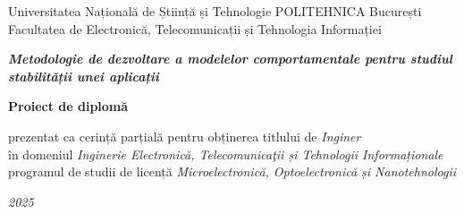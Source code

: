 \documentclass[12pt, a4paper, oneside, romanian]{teza-upb}
\begin{document}
\begin{titlepage}
\begin{center}
    \large Universitatea Națională de Știință și Tehnologie POLITEHNICA București\\
    \large Facultatea de Electronică, Telecomunicații și Tehnologia Informației\\
    
    \vspace*{7\baselineskip}
    
    \Large \textbf{\textit{Metodologie de dezvoltare a modelelor comportamentale pentru studiul stabilității unei aplicații}}\\
    
    \vspace*{2\baselineskip}

    \Huge \textbf{Proiect de diplomă}\\
    
    \vspace*{0.25\baselineskip}
    
    \large prezentat ca cerință parțială pentru obținerea titlului de \textit{Inginer}\\
    \large în domeniul \textit{Inginerie Electronică, Telecomunicaţii și Tehnologii Informaționale}\\
    \large programul de studii de licență \textit{Microelectronică, Optoelectronică și Nanotehnologii}\\
    
    \vspace*{3\baselineskip}
\end{center}


\vspace*{3\baselineskip}

\begin{center}
    \large \textit{2025}
\end{center}
\end{titlepage}
\end{document}
